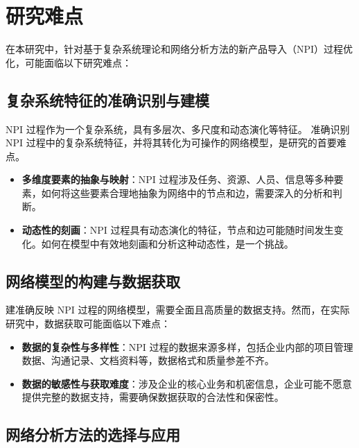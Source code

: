 \chapter{研究难点}

在本研究中，针对基于复杂系统理论和网络分析方法的新产品导入（NPI）过程优化，可能面临以下研究难点：

\section{复杂系统特征的准确识别与建模}

NPI 过程作为一个复杂系统，具有多层次、多尺度和动态演化等特征\citep{mitchell2009complexity}。
准确识别 NPI 过程中的复杂系统特征，并将其转化为可操作的网络模型，是研究的首要难点。

\begin{itemize}
  \item \textbf{多维度要素的抽象与映射}：NPI 过程涉及任务、资源、人员、信息等多种要素，如何将这些要素合理地抽象为网络中的节点和边，需要深入的分析和判断。
  
  \item \textbf{动态性的刻画}：NPI 过程具有动态演化的特征，节点和边可能随时间发生变化。如何在模型中有效地刻画和分析这种动态性，是一个挑战\citep{holme2012temporal}。
\end{itemize}

\section{网络模型的构建与数据获取}

建准确反映 NPI 过程的网络模型，需要全面且高质量的数据支持。然而，在实际研究中，数据获取可能面临以下难点：

\begin{itemize}
  \item \textbf{数据的复杂性与多样性}：NPI 过程的数据来源多样，包括企业内部的项目管理数据、沟通记录、文档资料等，数据格式和质量参差不齐\citep{borgatti2009network}。
  
  \item \textbf{数据的敏感性与获取难度}：涉及企业的核心业务和机密信息，企业可能不愿意提供完整的数据支持，需要确保数据获取的合法性和保密性。
\end{itemize}

\section{网络分析方法的选择与应用}

